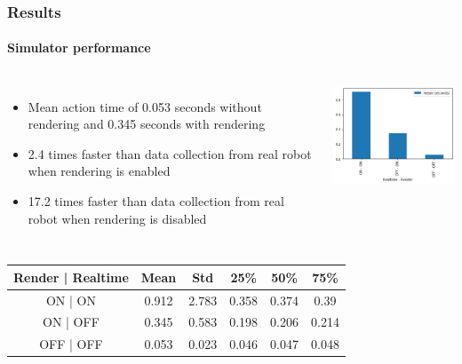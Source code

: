 \documentclass{beamer}
\begin{document}
	\begin{frame}
		\frametitle{Results}
		\framesubtitle{Simulator performance}
		
		\begin{columns}[c]
			\begin{itemize}
				\item Mean action time of 0.053 seconds without rendering and 0.345 seconds with rendering
				\item 2.4 times faster than data collection from real robot when rendering is enabled
				\item 17.2 times faster than data collection from real robot when rendering is disabled
			\end{itemize}
			
			\includegraphics[width=6cm]{benchmark-table-clearing.png}
		\end{columns}
	
	\begin{table}
		\begin{tabular}{|c|c|c|c|c|c|}
			\hline
			\textbf{Render | Realtime} & \textbf{Mean} & \textbf{Std} & \textbf{25\%} & \textbf{50\%} & \textbf{75\%} \\
			\hline
			ON | ON & 0.912 & 2.783 & 0.358 & 0.374 & 0.39 \\
			\hline
			ON | OFF & 0.345 & 0.583 & 0.198 & 0.206 & 0.214 \\
			\hline
			OFF | OFF & 0.053 & 0.023 & 0.046 & 0.047 & 0.048 \\
			\hline
		\end{tabular}
	\end{table}
	\end{frame}
\end{document}
